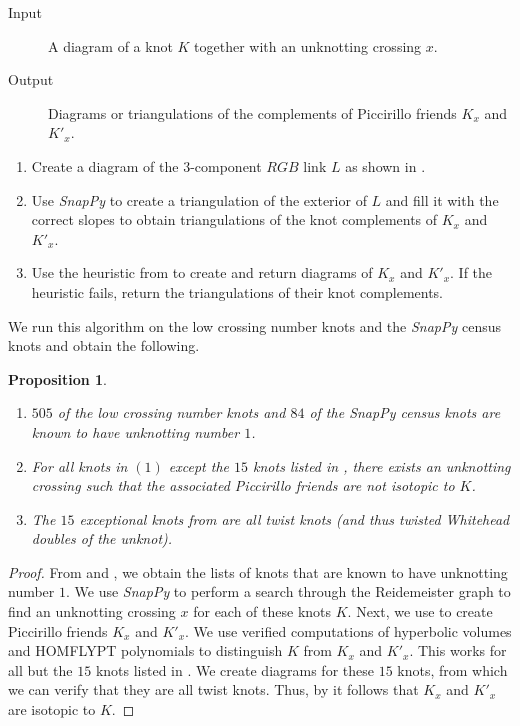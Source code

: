 \documentclass{amsart} %
\theoremstyle{thm}
\newtheorem{prop}[Theorem]{Proposition}
\theoremstyle{definition}
\numberwithin{equation}{section}
\begin{document}
\begin{algorithm}
\caption{Piccirillo friend search}
\label{alg:Piccirillo}
\begin{description}
    \item[Input] A diagram of a knot $K$ together with an unknotting crossing $x$.
    \item[Output] Diagrams or triangulations of the complements of Piccirillo friends $K_x$ and $K'_x$.
\end{description}

    \begin{enumerate}
        \item Create a diagram of the $3$-component $RGB$ link $L$ as shown in . 
        \item Use {\em SnapPy} to create a triangulation of the exterior of $L$ and fill it with the correct slopes to obtain triangulations of the knot complements of $K_x$ and $K'_x$. 
        \item Use the heuristic from \cite{Dunfield_exterior_to_link} to create and return diagrams of $K_x$ and $K'_x$. If the heuristic fails, return the triangulations of their knot complements.
    \end{enumerate}
\end{algorithm}

We run this algorithm on the low crossing number knots and the {\em SnapPy} census knots and obtain the following.

\begin{prop}\label{prop:dual_census}\hfill
\begin{enumerate}
    \item $505$ of the low crossing number knots and $84$ of the {\em SnapPy} census knots are known to have unknotting number $1$. 
    \item For all knots in $(1)$ except the $15$ knots listed in , there exists an unknotting crossing such that the associated Piccirillo friends are not isotopic to $K$.
    \item The $15$ exceptional knots from  are all twist knots (and thus twisted Whitehead doubles of the unknot).
\end{enumerate}
\end{prop}

\begin{proof}
    From \cite{KnotInfo} and \cite{CensusKnotInvariants}, we obtain the lists of knots that are known to have unknotting number $1$. We use {\em SnapPy} to perform a search through the Reidemeister graph to find an unknotting crossing $x$ for each of these knots $K$. Next, we use  to create Piccirillo friends $K_x$ and $K'_x$. We use verified computations of hyperbolic volumes and HOMFLYPT polynomials to distinguish $K$ from $K_x$ and $K'_x$. This works for all but the $15$ knots listed in . We create diagrams for these $15$ knots, from which we can verify that they are all twist knots. Thus, by  it follows that $K_x$ and $K'_x$ are isotopic to $K$.
\end{proof}
\end{document}
